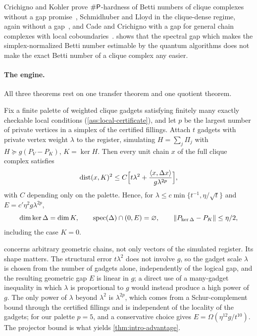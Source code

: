 Crichigno and Kohler prove \(\#\mathsf{P}\)-hardness of Betti numbers of clique complexes without a gap promise~\cite{crichigno2024clique}, Schmidhuber and Lloyd in the clique-dense regime, again without a gap~\cite{schmidhuber2023limitations}, and Cade and Crichigno with a gap for general chain complexes with local coboundaries~\cite{cade2024complexity}.  shows that the spectral gap which makes the simplex-normalized Betti number estimable by the quantum algorithms does not make the exact Betti number of a clique complex any easier.

\paragraph{The engine.}
All three theorems rest on one transfer theorem and one quotient theorem.

\begin{theorem}
\label{thm:intro-transfer}
Fix a finite palette of weighted clique gadgets satisfying finitely many exactly checkable local conditions (\cref{ass:local-certificate}), and let \(p\) be the largest number of private vertices in a simplex of the certified fillings. Attach \(t\) gadgets with private vertex weight \(\lambda\) to the register, simulating \(H=\sum_j\Pi_j\) with \(H\succeq g(P_V-P_{K})\), \(K=\ker H\). Then every unit chain \(x\) of the full clique complex satisfies
\begin{equation}
\label{eq:intro-concentration}
\operatorname{dist}(x,K)^2\le C\Bigl[t\lambda^2+\frac{\langle x,\Delta x\rangle}{g\lambda^{2p}}\Bigr],
\end{equation}
with \(C\) depending only on the palette. Hence, for \(\lambda\le c\min\{t^{-1},\eta/\sqrt t\}\) and \(E=c'\eta^2g\lambda^{2p}\),
\[
\dim\ker\Delta=\dim K,\qquad\operatorname{spec}(\Delta)\cap(0,E)=\varnothing,\qquad
\|P_{\ker\Delta}-P_K\|\le\eta/2,
\]
including the case \(K=0\).
\end{theorem}

 concerns arbitrary geometric chains, not only vectors of the simulated register. Its shape matters. The structural error \(t\lambda^2\) does not involve \(g\), so the gadget scale \(\lambda\) is chosen from the number of gadgets alone, independently of the logical gap, and the resulting geometric gap \(E\) is linear in \(g\); a direct use of a many-gadget inequality in which \(\lambda\) is proportional to \(g\) would instead produce a high power of \(g\). The only power of \(\lambda\) beyond \(\lambda^2\) is \(\lambda^{2p}\), which comes from a Schur-complement bound through the certified fillings and is independent of the locality of the gadgets; for our palette \(p=5\), and a conservative choice gives \(E=\Omega(\eta^{12}g/t^{10})\). The projector bound is what yields \cref{thm:intro-advantage}.

